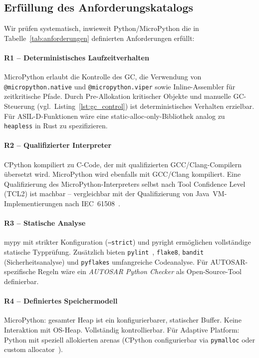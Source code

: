 ﻿\documentclass[12pt,a4paper,twoside]{article}
\begin{document}
\subsection{Erfüllung des Anforderungskatalogs}
\label{subsec:anforderungen_erfuellung}

Wir prüfen systematisch, inwieweit Python/MicroPython die in
Tabelle~\ref{tab:anforderungen} definierten Anforderungen erfüllt:

\paragraph{R1 -- Deterministisches Laufzeitverhalten}
MicroPython erlaubt die Kontrolle des GC, die Verwendung von
\texttt{@micropython.native} und \texttt{@micropython.viper} sowie
Inline-Assembler für zeitkritische Pfade.
Durch Pre-Allokation kritischer Objekte und manuelle GC-Steuerung
(vgl.\ Listing~\ref{lst:gc_control}) ist deterministisches Verhalten
erzielbar. Für ASIL-D-Funktionen wäre eine static-alloc-only-Bibliothek
analog zu \texttt{heapless} in Rust zu spezifizieren.

\paragraph{R2 -- Qualifizierter Interpreter}
CPython kompiliert zu C-Code, der mit qualifizierten GCC/Clang-Compilern
übersetzt wird. MicroPython wird ebenfalls mit GCC/Clang kompiliert.
Eine Qualifizierung des MicroPython-Interpreters selbst nach
Tool Confidence Level (TCL2) ist machbar -- vergleichbar mit
der Qualifizierung von Java~VM-Implementierungen nach IEC~61508~\cite{jvm_qualification2018}.

\paragraph{R3 -- Statische Analyse}
mypy mit strikter Konfiguration (\texttt{--strict}) und pyright
ermöglichen vollständige statische Typprüfung. Zusätzlich bieten
\texttt{pylint}~\cite{pylint2023}, \texttt{flake8}, \texttt{bandit}
(Sicherheitsanalyse) und \texttt{pyflakes} umfangreiche Codeanalyse.
Für AUTOSAR-spezifische Regeln wäre ein \emph{AUTOSAR Python Checker}
als Open-Source-Tool definierbar.

\paragraph{R4 -- Definiertes Speichermodell}
MicroPython: gesamter Heap ist ein konfigurierbarer, statischer Buffer.
Keine Interaktion mit OS-Heap. Vollständig kontrollierbar.
Für Adaptive Platform: Python mit speziell allokierten arenas
(CPython configurierbar via \texttt{pymalloc} oder
custom allocator~\cite{cpython_allocator2022}).
\end{document}
